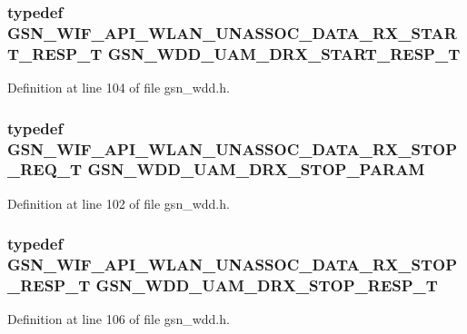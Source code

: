 \hypertarget{a00603_a033e778f5ece6db55afcb7f609e15815}{
\subsubsection[{GSN\_\-WDD\_\-UAM\_\-DRX\_\-START\_\-RESP\_\-T}]{\setlength{\rightskip}{0pt plus 5cm}typedef {\bf GSN\_\-WIF\_\-API\_\-WLAN\_\-UNASSOC\_\-DATA\_\-RX\_\-START\_\-RESP\_\-T} {\bf GSN\_\-WDD\_\-UAM\_\-DRX\_\-START\_\-RESP\_\-T}}}
\label{a00603_a033e778f5ece6db55afcb7f609e15815}


Definition at line 104 of file gsn\_\-wdd.h.

\hypertarget{a00603_a82650badd5df3ae66988f45fd22b5434}{
\subsubsection[{GSN\_\-WDD\_\-UAM\_\-DRX\_\-STOP\_\-PARAM}]{\setlength{\rightskip}{0pt plus 5cm}typedef {\bf GSN\_\-WIF\_\-API\_\-WLAN\_\-UNASSOC\_\-DATA\_\-RX\_\-STOP\_\-REQ\_\-T} {\bf GSN\_\-WDD\_\-UAM\_\-DRX\_\-STOP\_\-PARAM}}}
\label{a00603_a82650badd5df3ae66988f45fd22b5434}


Definition at line 102 of file gsn\_\-wdd.h.

\hypertarget{a00603_a0114b1685f0227b6028a08964c5b0cbd}{
\subsubsection[{GSN\_\-WDD\_\-UAM\_\-DRX\_\-STOP\_\-RESP\_\-T}]{\setlength{\rightskip}{0pt plus 5cm}typedef {\bf GSN\_\-WIF\_\-API\_\-WLAN\_\-UNASSOC\_\-DATA\_\-RX\_\-STOP\_\-RESP\_\-T} {\bf GSN\_\-WDD\_\-UAM\_\-DRX\_\-STOP\_\-RESP\_\-T}}}
\label{a00603_a0114b1685f0227b6028a08964c5b0cbd}


Definition at line 106 of file gsn\_\-wdd.h.

